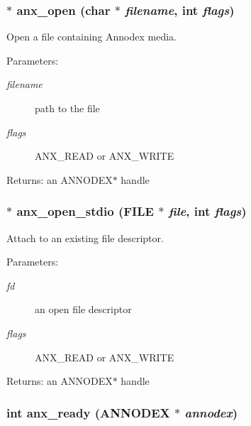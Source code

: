\subsubsection{$\ast$ anx\_\-open (char $\ast$ {\em filename}, int {\em flags})}\label{anx__general_8h_a3}


Open a file containing Annodex media. 

\begin{Desc}
\item[Parameters:]
\begin{description}
\item[{\em filename}]path to the file \item[{\em flags}]ANX\_\-READ or ANX\_\-WRITE \end{description}
\end{Desc}
\begin{Desc}
\item[Returns:]an ANNODEX$\ast$ handle \end{Desc}
\subsubsection{$\ast$ anx\_\-open\_\-stdio (FILE $\ast$ {\em file}, int {\em flags})}\label{anx__general_8h_a4}


Attach to an existing file descriptor. 

\begin{Desc}
\item[Parameters:]
\begin{description}
\item[{\em fd}]an open file descriptor \item[{\em flags}]ANX\_\-READ or ANX\_\-WRITE \end{description}
\end{Desc}
\begin{Desc}
\item[Returns:]an ANNODEX$\ast$ handle \end{Desc}
\subsubsection{\setlength{\rightskip}{0pt plus 5cm}int anx\_\-ready ({\bf ANNODEX} $\ast$ {\em annodex})}\label{anx__general_8h_a9}


